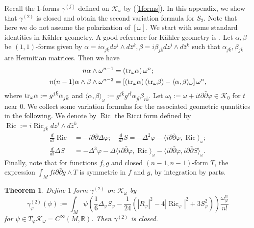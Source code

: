 \documentclass[12pt,reqno,a4paper]{amsart}
\numberwithin{equation}{section}
\def\bz{\bar z}
\def\bk{\bar k}
\def\bl{\bar l}
\def\p{\partial}
\def\bp{\bar\partial}
\def\a{\alpha}
\def\b{\beta}
\def\tr{{\rm tr}}
\DeclareMathOperator{\ric}{Ric}
\newtheorem{thm}{{\sc Theorem}}[section]
\theoremstyle{remark}
\theoremstyle{dotless}
\begin{document}
Recall the $1$-forms $\gamma^{(j)}$ defined on $\mathcal{K}_\omega$ by (\ref{1forms}). In this appendix, we show that $\gamma^{(2)}$ is closed and obtain the second variation formula for $S_2$. Note that here we do not assume the polarization of $[\omega]$. We start with some standard identities in K\"ahler geometry. A good reference for K\"ahler geometry is \cite{szekelyhidi2014introduction}. Let $\a, \b$ be $(1,1)$-forms given by $\a=i\a_{j\bk}dz^j\wedge d\bz^k, \b=i\b_{j\bk}dz^j\wedge d\bz^k$ such that $\a_{j\bk},\b_{j\bk}$ are Hermitian matrices. Then we have
\begin{align}
n\a\wedge\omega^{n-1}&=\left(\tr_{\omega}\a\right)\omega^n ;\label{computation1}\\
n(n-1)\a\wedge\b\wedge\omega^{n-2}&=\left[ \left(\tr_{\omega}\a\right) \left(\tr_{\omega}\b\right) -\langle\a,\b\rangle_{\omega} \right]\omega^n,\label{computation2}
\end{align}
where $\tr_{\omega}\a:=g^{j\bk}\a_{j\bk}$ and $\langle\a,\b\rangle_{\omega}:=g^{j\bk}g^{r\bl}\a_{j\bl}\b_{r\bk}$. Let $\omega_t:=\omega+it\p\bp\varphi\in\mathcal{K}_0$ for $t$ near $0$. We collect some variation formulas for the associated geometric quantities in the following. We denote by $\ric$ the Ricci form defined by $\ric:=i\ric_{j\bk}dz^j\wedge d\bz^k$.
\begin{align*}
\frac{d}{dt}\ric&=-i\p\bp\Delta\varphi ; \quad \frac{d}{dt} S=-\Delta^2 \varphi - \langle i\p\bp\varphi,\ric \rangle_{\omega};\\
\frac{d}{dt}\Delta S &= -\Delta^3\varphi -\Delta\langle i\p\bp\varphi,\ric \rangle_{\omega}-\langle i\p\bp\varphi,i\p\bp S\rangle_{\omega}.
\end{align*}
Finally, note that for functions $f, g$ and closed $(n-1,n-1)$-form $T$, the expression $\int_M f i\p\bp g\wedge T$ is symmetric in $f$ and $g$, by integration by parts.

\begin{thm}
Define $1$-form $\gamma^{(2)}$ on $\mathcal{K}_\omega$ by
\begin{equation*}
\gamma^{(2)}_{\varphi}(\psi):=\int_M \psi \left( \frac{1}{6}\Delta_\varphi S_\varphi-\frac{1}{24}\left(|R_\varphi|^2-4|\ric_\varphi|^2+3S_\varphi^2\right) \right) \frac{\omega_\varphi^n}{n!}
\end{equation*}
for $\psi\in T_{\varphi}\mathcal{K}_\omega=C^{\infty}(M,\mathbb{R})$. Then $\gamma^{(2)}$ is closed.
\end{thm}
\end{document}
